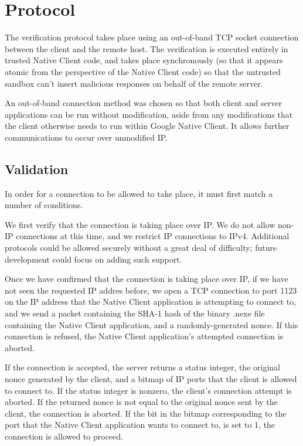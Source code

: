 \documentclass[a4paper,10pt]{article}
\begin{document}
\section{Protocol}

The verification protocol takes place using an out-of-band TCP socket
connection between the client and the remote host.  The verification is
executed entirely in trusted Native Client code, and takes place synchronously
(so that it appears atomic from the perspective of the Native Client code) so
that the untrusted sandbox can't insert malicious responses on behalf of the
remote server.

An out-of-band connection method was chosen so that both client and server
applications can be run without modification, aside from any modifications that
the client otherwise needs to run within Google Native Client.  It allows
further communications to occur over unmodified IP.

\subsection{Validation}

In order for a connection to be allowed to take place, it must first match a
number of conditions.

We first verify that the connection is taking place over IP.  We do not allow
non-IP connections at this time, and we restrict IP connections to IPv4.
Additional protocols could be allowed securely without a great deal of
difficulty; future development could focus on adding such support.

Once we have confirmed that the connection is taking place over IP, if we have
not seen the requested IP addres before, we open a TCP connection to port 1123
on the IP address that the Native Client application is attempting to connect
to, and we send a packet containing the SHA-1 hash of the binary .nexe file
containing the Native Client application, and a randomly-generated nonce.  If
this connection is refused, the Native Client application's attempted connection
is aborted.

If the connection is accepted, the server returns a status integer, the
original nonce generated by the client, and a bitmap of IP ports that the
client is allowed to connect to.  If the status integer is nonzero, the
client's connection attempt is aborted.  If the returned nonce is not equal to
the original nonce sent by the client, the connection is aborted.  If the bit in
the bitmap corresponding to the port that the Native Client application wants
to connect to, is set to 1, the connection is allowed to proceed.
\end{document}

